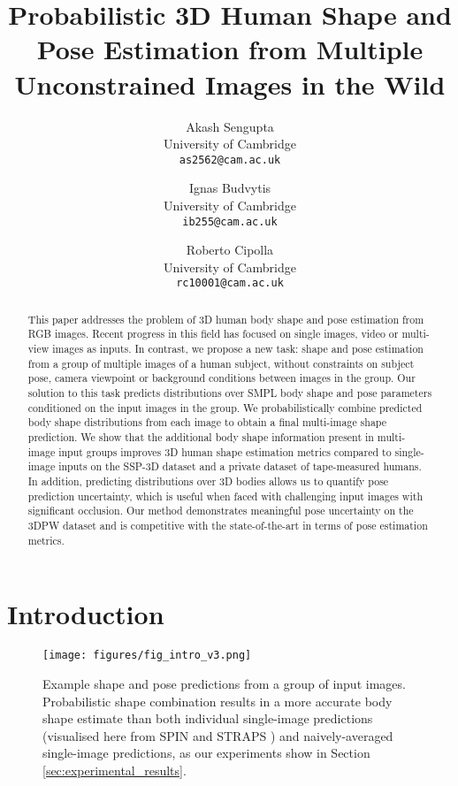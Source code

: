 \documentclass[final]{cvpr}
\begin{document}
\title{Probabilistic 3D Human Shape and Pose Estimation from Multiple Unconstrained Images in the Wild}

\author{Akash Sengupta\\
University of Cambridge\\
{\tt\small as2562@cam.ac.uk}
\and
Ignas Budvytis\\
University of Cambridge\\
{\tt\small ib255@cam.ac.uk}
\and 
Roberto Cipolla\\
University of Cambridge\\
{\tt\small rc10001@cam.ac.uk}
}

\maketitle


\begin{abstract}
   This paper addresses the problem of 3D human body shape and pose estimation from RGB images. Recent progress in this field has focused on single images, video or multi-view images as inputs. In contrast, we propose a new task: shape and pose estimation from a group of multiple images of a human subject, without constraints on subject pose, camera viewpoint or background conditions between images in the group. Our solution to this task predicts distributions over SMPL body shape and pose parameters conditioned on the input images in the group. We probabilistically combine predicted body shape distributions from each image to obtain a final multi-image shape prediction. We show that the additional body shape information present in multi-image input groups improves 3D human shape estimation metrics compared to single-image inputs on the SSP-3D dataset and a private dataset of tape-measured humans. In addition, predicting distributions over 3D bodies allows us to quantify pose prediction uncertainty, which is useful when faced with challenging input images with significant occlusion. Our method demonstrates meaningful pose uncertainty on the 3DPW dataset and is competitive with the state-of-the-art in terms of pose estimation metrics.
\end{abstract}
\vspace{-0.4cm}

\section{Introduction}

\begin{figure}[t]
    \centering
    \texttt{[image: figures/fig\_intro\_v3.png]}
    \caption{Example shape and pose predictions from a group of input images. Probabilistic shape combination results in a more accurate body shape estimate than both individual single-image predictions (visualised here from SPIN \cite{kolotouros2019spin} and STRAPS \cite{STRAPS2020BMVC}) and naively-averaged single-image predictions, as our experiments show in Section \ref{sec:experimental_results}.}
    \label{fig:intro}
    \vspace{-0.4cm}
\end{figure}
\end{document}
